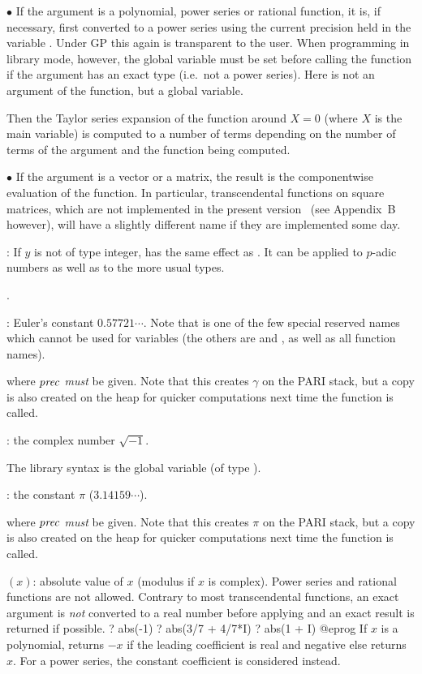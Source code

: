 $\bullet$ If the argument is a polynomial, power series or rational function,
it is, if necessary, first converted to a power series using the current
precision held in the variable . Under GP this again is
transparent to the user. When programming in library mode, however, the
global variable  must be set before calling the function if the
argument has an exact type (i.e.~not a power series). Here  is
not an argument of the function, but a global variable.

Then the Taylor series expansion of the function around $X=0$ (where $X$ is
the main variable) is computed to a number of terms depending on the number
of terms of the argument and the function being computed.

$\bullet$ If the argument is a vector or a matrix, the result is the
componentwise evaluation of the function. In particular, transcendental
functions on square matrices, which are not implemented in the present
version \vers\ (see Appendix~B however), will have a slightly different name
if they are implemented some day.

\subseckbd{\pow}: If $y$ is not of type integer,  has the same
effect as . It can be applied to $p$-adic numbers as
well as to the more usual types.

.

: Euler's constant $0.57721\cdots$. Note that 
is one of the few special reserved names which cannot be used for variables
(the others are  and , as well as all function names).
\label{se:euler}

 where $\hbox{\it prec\/}$ \emph{must} be given. Note that
this creates $\gamma$ on the PARI stack, but a copy is also created on the
heap for quicker computations next time the function is called.

: the complex number $\sqrt{-1}$.

The library syntax is the global variable  (of type ).

: the constant $\pi$ ($3.14159\cdots$).\label{se:pi}

 where $\hbox{\it prec\/}$ \emph{must} be given. Note that this
creates $\pi$ on the PARI stack, but a copy is also created on the heap for
quicker computations next time the function is called.

$(x)$: absolute value of $x$ (modulus if $x$ is complex).
Power series and rational functions are not allowed. Contrary to most
transcendental functions, an exact argument is \emph{not} converted to a real
number before applying  and an exact result is returned if possible.
\bprog
? abs(-1)
? abs(3/7 + 4/7*I)
? abs(1 + I)
@eprog
\noindent If $x$ is a polynomial, returns $-x$ if the leading coefficient is
real and negative else returns $x$. For a power series, the constant
coefficient is considered instead.


